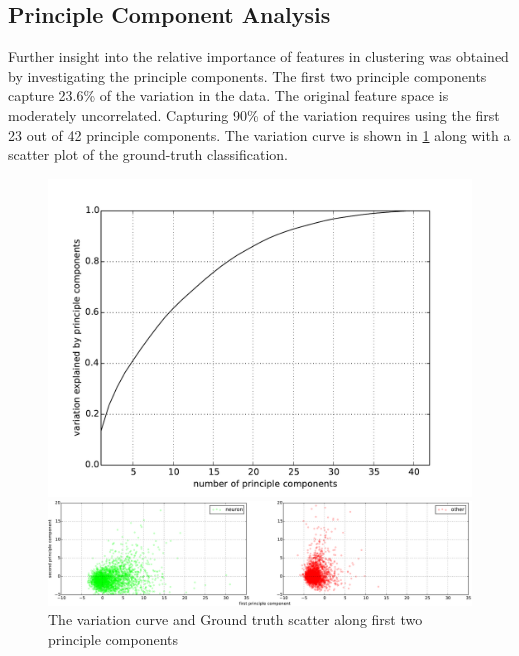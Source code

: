 \documentclass[10pt]{article}
\begin{document}
\subsection{Principle Component Analysis}

Further insight into the relative importance of features in clustering was obtained by investigating the principle components.
The first two principle components capture \num{23.6}\% of the variation in the data.
The original feature space is moderately uncorrelated.
Capturing \num{90}\% of the variation requires using the first \num{23} out of \num{42} principle components.
The variation curve is shown in \cref{fig:variation} along with a scatter plot of the ground-truth classification.

\begin{figure}[h]
    \centering

    \begin{minipage}{0.25\textwidth}
      \centering
      \includegraphics[width=\textwidth]{figs/variation.pdf}
    \end{minipage}
    \begin{minipage}{0.70\textwidth}
      \centering
      \vspace{2mm}
      \includegraphics[width=\textwidth]{figs/PCA_scatter_cropped.pdf}
    \end{minipage}
    \caption{\footnotesize The variation curve and Ground truth scatter along first two principle components}
    \label{fig:variation}
\end{figure}
\end{document}
